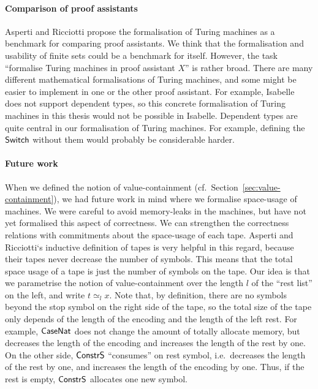 \paragraph{Comparison of proof assistants}
Asperti and Ricciotti\cite{asperti2015} propose the formalisation of Turing machines as a benchmark for comparing proof assistants.  We think that the
formalisation and usability of finite sets could be a benchmark for itself.  However, the task ``formalise Turing machines in proof assistant $X$'' is
rather broad.  There are many different mathematical formalisations of Turing machines, and some might be easier to implement in one or the other
proof assistant.  For example, Isabelle does not support dependent types, so this concrete formalisation of Turing machines in this thesis would not
be possible in Isabelle.  Dependent types are quite central in our formalisation of Turing machines.  For example, defining the $\mathsf{Switch}$ without them
would probably be considerable harder.



\paragraph{Future work}
When we defined the notion of value-containment (cf.~Section~\ref{sec:value-containment}), we had future work in mind where we formalise space-usage
of machines.  We were careful to avoid memory-leaks in the machines, but have not yet formalised this aspect of correctness.  We can strengthen the
correctness relations with commitments about the space-usage of each tape.  Asperti and Ricciotti`s inductive definition of tapes is very helpful in
this regard, because their tapes never decrease the number of symbols.  This means that the total space usage of a tape is just the number of symbols
on the tape.  Our idea is that we parametrise the notion of value-containment over the length $l$ of the ``rest list'' on the left, and write
$t \simeq_{l} x$.  Note that, by definition, there are no symbols beyond the stop symbol on the right side of the tape, so the total size of the tape
only depends of the length of the encoding and the length of the left rest.  For example, $\mathsf{CaseNat}$ does not change the amount of totally
allocate memory, but decreases the length of the encoding and increases the length of the rest by one.  On the other side, $\mathsf{ConstrS}$ ``consumes''
on rest symbol, i.e.\ decreases the length of the rest by one, and increases the length of the encoding by one.  Thus, if the rest is empty,
$\mathsf{ConstrS}$ allocates one new symbol.

